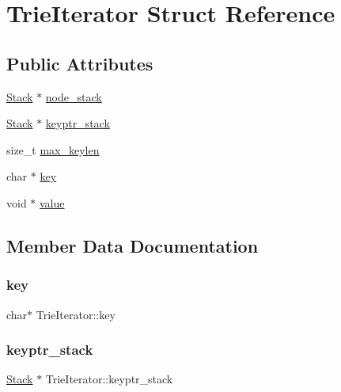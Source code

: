 \hypertarget{structTrieIterator}{}\section{Trie\+Iterator Struct Reference}
\label{structTrieIterator}
\subsection*{Public Attributes}
\begin{DoxyCompactItemize}
\item 
\mbox{\hyperlink{stack_8h_aa7883e8bf747b9dedec990b539df2cc0}{Stack}} $\ast$ \mbox{\hyperlink{structTrieIterator_a7371ff311cb4d122b327db7d36a853b6}{node\+\_\+stack}}
\item 
\mbox{\hyperlink{stack_8h_aa7883e8bf747b9dedec990b539df2cc0}{Stack}} $\ast$ \mbox{\hyperlink{structTrieIterator_ad005a81bc9c0fd1745cd4389cd5923cb}{keyptr\+\_\+stack}}
\item 
size\+\_\+t \mbox{\hyperlink{structTrieIterator_abdeaac0e322f45e7b8d0e5f3dc0eeb20}{max\+\_\+keylen}}
\item 
char $\ast$ \mbox{\hyperlink{structTrieIterator_a15ad743f0b8c6f40616b965480a64cb1}{key}}
\item 
void $\ast$ \mbox{\hyperlink{structTrieIterator_a9b38eada0f43079f0a6b51e01eedfb8b}{value}}
\end{DoxyCompactItemize}


\subsection{Member Data Documentation}
\mbox{\label{structTrieIterator_a15ad743f0b8c6f40616b965480a64cb1}} 
\subsubsection{\texorpdfstring{key}{key}}
{\footnotesize\ttfamily char$\ast$ Trie\+Iterator\+::key}

\mbox{\label{structTrieIterator_ad005a81bc9c0fd1745cd4389cd5923cb}} 
\subsubsection{\texorpdfstring{keyptr\_stack}{keyptr\_stack}}
{\footnotesize\ttfamily \mbox{\hyperlink{stack_8h_aa7883e8bf747b9dedec990b539df2cc0}{Stack}} $\ast$ Trie\+Iterator\+::keyptr\+\_\+stack}

